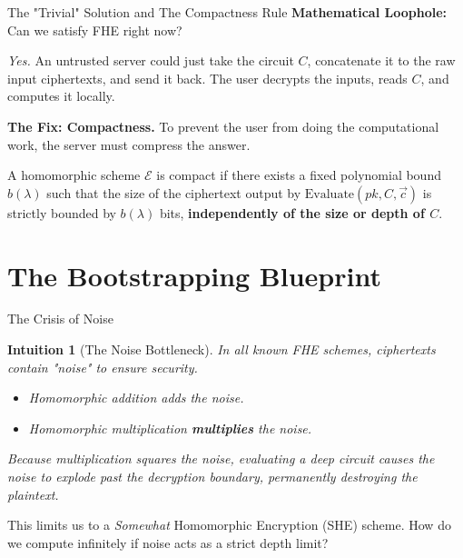 \documentclass[10pt, aspectratio=169]{beamer}
\newtheorem{intuition}{Intuition}
\begin{document}
\begin{frame}{The "Trivial" Solution and The Compactness Rule}
    \textbf{Mathematical Loophole:} Can we satisfy FHE right now? 
    \pause
    
    \textit{Yes.} An untrusted server could just take the circuit $C$, concatenate it to the raw input ciphertexts, and send it back. The user decrypts the inputs, reads $C$, and computes it locally.
    \pause
    
    \vspace{0.3cm}
    \textbf{The Fix: Compactness.} To prevent the user from doing the computational work, the server must compress the answer.
    \pause

    \begin{definition}[Compactness]
    A homomorphic scheme $\mathcal{E}$ is compact if there exists a fixed polynomial bound $b(\lambda)$ such that the size of the ciphertext output by $\text{Evaluate}(pk, C, \vec{c})$ is strictly bounded by $b(\lambda)$ bits, \textbf{independently of the size or depth of $C$}.
    \end{definition}
\end{frame}

\section{The Bootstrapping Blueprint}

\begin{frame}{The Crisis of Noise}
    \begin{intuition}[The Noise Bottleneck]
    In all known FHE schemes, ciphertexts contain "noise" to ensure security. 
    \begin{itemize}
        \item Homomorphic addition adds the noise.
        \item Homomorphic multiplication \textbf{multiplies} the noise.
    \end{itemize}
    Because multiplication squares the noise, evaluating a deep circuit causes the noise to explode past the decryption boundary, permanently destroying the plaintext.
    \end{intuition}
    \pause
    
    \vspace{0.3cm}
    This limits us to a \textit{Somewhat} Homomorphic Encryption (SHE) scheme. How do we compute infinitely if noise acts as a strict depth limit?
\end{frame}
\end{document}
